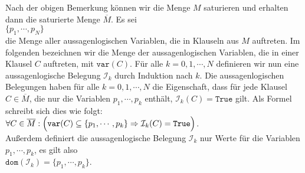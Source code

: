 Nach der obigen Bemerkung können wir die Menge $M$ saturieren und erhalten dann die satu\-rierte Menge
$\overline{M}$.  Es sei  
\\[0.2cm]
\hspace*{1.3cm}
$\{ p_1, \cdots, p_N \}$
\\[0.2cm]
die Menge aller aussagenlogischen Variablen, die in Klauseln aus $M$ auftreten.  Im folgenden be\-zeichnen wir
die Menge der aussagenlogischen Variablen, die in einer Klausel $C$ auftreten, mit $\mathtt{var}(C)$.
Für alle $k=0,1,\cdots,N$
definieren wir nun eine aussagenlogische Belegung $\mathcal{I}_k$ durch Induktion nach $k$.  Die
aussagenlogischen Belegungen haben für alle $k=0,1,\cdots,N$ die Eigenschaft, dass für jede Klausel $C \in \overline{M}$,
die nur die Variablen $p_1,\cdots,p_k$ enthält,
$\mathcal{I}_k(C) = \mathtt{True}$ gilt.  Als Formel schreibt sich dies wie folgt:
\\[0.2cm]
\hspace*{1.3cm}
$\forall C \in \overline{M}:\Bigl(\mathtt{var}(C) \subseteq \{p_1, \cdots, p_k\} \Rightarrow \mathcal{I}_k(C) = \mathtt{True}\Bigl)$.
\\[0.2cm]
Außerdem definiert die aussagenlogische Belegung $\mathcal{I}_k$ nur Werte für die Variablen
$p_1,\cdots,p_k$, es gilt also
\\[0.2cm]
\hspace*{1.3cm}
$\mathtt{dom}(\mathcal{I}_k) = \{p_1, \cdots, p_k\}$.
